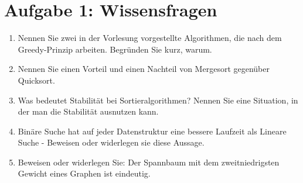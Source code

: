 \documentclass{scrartcl}
\begin{document}
\section*{Aufgabe 1: Wissensfragen}
\begin{enumerate}[(1)]
\item Nennen Sie zwei in der Vorlesung vorgestellte Algorithmen, die nach dem Greedy-Prinzip arbeiten. Begründen Sie kurz, warum.

\item Nennen Sie einen Vorteil und einen Nachteil von Mergesort gegenüber Quicksort.

\item Was bedeutet Stabilität bei Sortieralgorithmen? Nennen Sie eine Situation, in der man die Stabilität ausnutzen kann.

\item Bin\"are Suche hat auf jeder Datenstruktur eine bessere Laufzeit als Lineare Suche - Beweisen oder widerlegen sie diese Aussage.

\item Beweisen oder widerlegen Sie: Der Spannbaum mit dem zweitniedrigsten Gewicht eines Graphen ist eindeutig. 
\end{enumerate}
\end{document}
